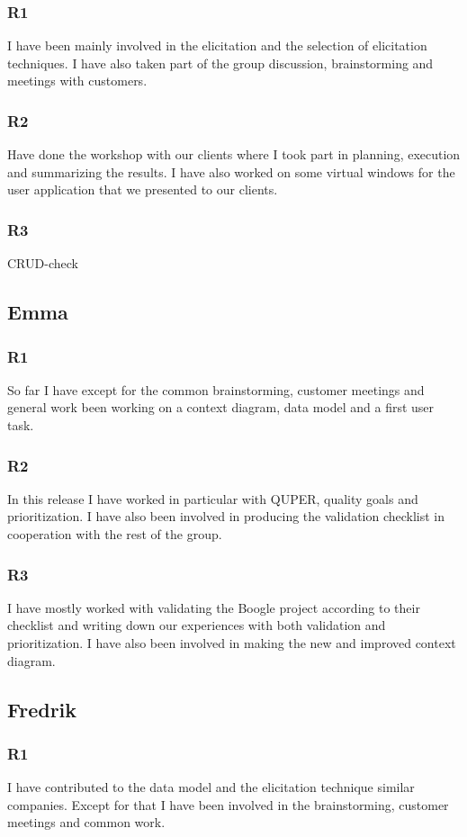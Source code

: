 \documentclass[a4paper]{article}
\begin{document}
		\subsubsection{R1}
		I have been mainly involved in the elicitation and the selection of elicitation techniques. I have also taken part of the group discussion, brainstorming and meetings with customers.
		\subsubsection{R2}
		Have done the workshop with our clients where I took part in planning, execution and summarizing the results. I have also worked on some virtual windows for the user application that we presented to our clients. 
		\subsubsection{R3}
			CRUD-check			
			
	\subsection{Emma}
		\subsubsection{R1}
		So far I have except for the common brainstorming, customer meetings and general work been working on a context diagram, data model and a first user task.
		\subsubsection{R2}
	In this release I have worked in particular with QUPER, quality goals and prioritization. I have also been involved in producing the validation checklist in cooperation with the rest of the group.
		\subsubsection{R3}
		I have mostly worked with validating the Boogle project according to their checklist and writing down our experiences with both validation and prioritization. I have also been involved in making the new and improved context diagram.
			
	\subsection{Fredrik}
		\subsubsection{R1}
		I have contributed to the data model and the elicitation technique similar companies. Except for that I have been involved in the brainstorming, customer meetings and common work.
\end{document}

